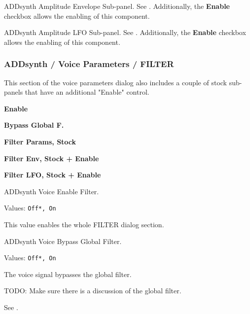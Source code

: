    ADDsynth Amplitude Envelope Sub-panel.
   See .
   Additionally, the \textbf{Enable} checkbox allows the enabling of this
   component.

   ADDsynth Amplitude LFO Sub-panel.
   See .
   Additionally, the \textbf{Enable} checkbox allows the enabling of this
   component.

\subsubsection{ADDsynth / Voice Parameters / FILTER}
\label{subsubsec:addsynth_voice_parameters_filter}

   This section of the voice parameters dialog also includes a couple of
   stock sub-panels that have an additional "Enable" control.

   \begin{enumber}
      \item \textbf{Enable}
      \item \textbf{Bypass Global F.}
      \item \textbf{Filter Params, Stock}
      \item \textbf{Filter Env, Stock + Enable}
      \item \textbf{Filter LFO, Stock + Enable}
   \end{enumber}

   \setcounter{ItemCounter}{0}      %

   ADDsynth Voice Enable Filter.

   Values: \texttt{Off*, On}

   This value enables the whole FILTER dialog section.

   ADDsynth Voice Bypass Global Filter.

   Values: \texttt{Off*, On}

   The voice signal bypasses the global filter.

   TODO:  Make sure there is a discussion of the global filter.

   See .

